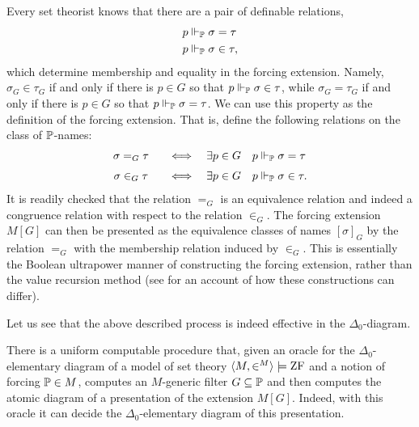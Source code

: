 \documentclass{amsart}
\begin{document}
Every set theorist knows that there are a pair of definable relations,
\begin{align*}
p &\forces_\P \sigma = \tau \\
p &\forces_\P \sigma \in \tau,
\end{align*}
which determine membership and equality in the forcing extension. Namely, $\sigma_G \in \tau_G$ if and only if there is $p \in G$ so that $p \forces_\P \sigma \in \tau$, while $\sigma_G = \tau_G$ if and only if there is $p \in G$ so that $p \forces_\P \sigma = \tau$.
We can use this property as the definition of the forcing extension. That is, define the following relations on the class of $\P$-names:
  $$\begin{array}{cl}
      \sigma =_G \tau\quad &\Iff \quad \exists p\in G\quad p\forces_\P \sigma=\tau \medskip\\
      \sigma \in_G \tau\quad &\Iff \quad \exists p\in G\quad p\forces_\P \sigma\in\tau.\\
  \end{array}
  $$
It is readily checked that the relation $=_G$ is an equivalence relation and indeed a congruence relation with respect to the relation $\in_G$. The forcing extension $M[G]$ can then be presented as the equivalence classes of names $[\sigma]_G$ by the relation $=_G$ with the membership relation induced by $\in_G$. This is essentially the Boolean ultrapower manner of constructing the forcing extension, rather than the value recursion method (see \cite{HamkinsSeabold:BooleanUltrapowers} for an account of how these constructions can differ).

Let us see that the above described process is indeed effective in the $\Delta_0$-diagram.

\begin{theorem}\label{Theorem.Computing-atomic-diagram-of-extension}
There is a uniform computable procedure that, given an oracle for the $\Delta_0$-elementary diagram of a model of set theory $\<M,\in^M> \satisfies \ZF$ and a notion of forcing $\P \in M$, computes an $M$-generic filter $G \of \P$ and then computes the atomic diagram of a presentation of the extension $M[G]$. Indeed, with this oracle it can decide the $\Delta_0$-elementary diagram of this presentation.
\end{theorem}
\end{document}
